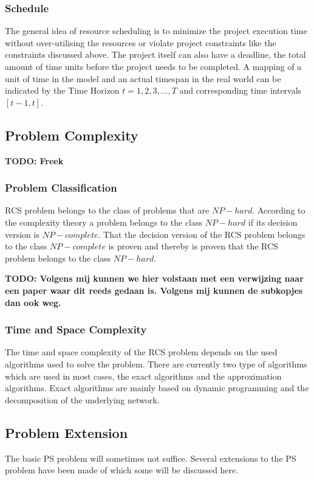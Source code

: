 \documentclass{article}
\newcommand{\TODO}[1]{{\color{red}\textbf{TODO: #1}}}
\begin{document}
\subsubsection{Schedule}
The general idea of resource scheduling is to minimize the project execution time without over-utilising the resources or violate project constraints like the constraints discussed above. The project itself can also have a deadline, the total amount of time units before the project needs to be completed. A mapping of a unit of time in the model and an actual timespan in the real world can be indicated by the Time Horizon $t=1,2,3,. . .,T$ and corresponding time intervals $[t-1,t]$. 

\subsection{Problem Complexity}
\TODO{Freek}
\subsubsection{Problem Classification}
RCS problem belongs to the class of problems that are $NP-hard$. According to the complexity theory a problem belongs to the class $NP-hard$ if its decision version is $NP-complete$. That the decision version of the RCS problem belongs to the class $NP-complete$ is proven and thereby is proven that the RCS problem belongs to the class $NP-hard$.

\TODO{Volgens mij kunnen we hier volstaan met een verwijzing naar een paper waar dit reeds gedaan is. Volgens mij kunnen de subkopjes dan ook weg.}
\subsubsection{Time and Space Complexity}
The time and space complexity of the RCS problem depends on the used algorithms used to solve the problem. There are currently two type of algorithms which are used in most cases, the exact algorithms and the approximation algorithms.
Exact algorithms are mainly based on dynamic programming and the decomposition of the underlying network. 

\subsection{Problem Extension}
The basic PS problem will sometimes not suffice. Several extensions to the PS problem have been made of which some will be discussed here. 
\end{document}
